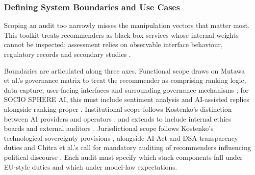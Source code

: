 \documentclass[11pt]{article}
\begin{document}
\subsubsection{Defining System Boundaries and Use Cases}
\label{sec:defining_system_boundaries_use_cases} Scoping an audit too narrowly misses the manipulation vectors that matter most. This toolkit treats recommenders as black-box services whose internal weights cannot be inspected; assessment relies on observable interface behaviour, regulatory records and secondary studies \parencites[7]{6295677}[2]{8958037}[2]{3303310}.

Boundaries are articulated along three axes. Functional scope draws on Mutawa et al.'s governance matrix to treat the recommender as comprising ranking logic, data capture, user-facing interfaces and surrounding governance mechanisms \parencites{2702055}; for SOCIO SPHERE AI, this must include sentiment analysis and AI-assisted replies alongside ranking proper \parencites{3413731}. Institutional scope follows Kostenko's distinction between AI providers and operators \parencites[20]{2977039}, and extends to include internal ethics boards and external auditors \parencites[2]{0375818}{2702055}. Jurisdictional scope follows Kostenko's technological-sovereignty provisions \parencites[108]{2977039}, alongside AI Act and DSA transparency duties and Chitra et al.'s call for mandatory auditing of recommenders influencing political discourse \parencites[16]{6502223}. Each audit must specify which stack components fall under EU-style duties and which under model-law expectations.
\end{document}
